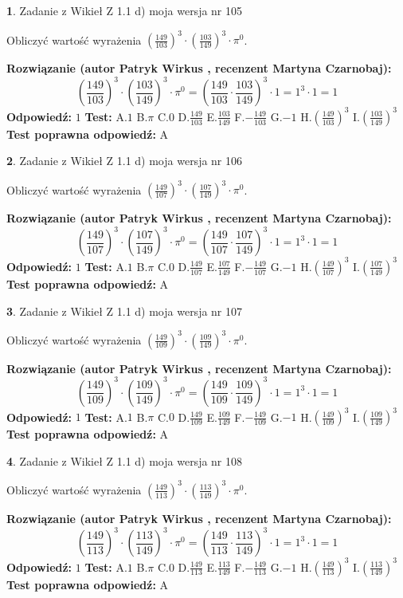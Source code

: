 \documentclass[12pt, a4paper]{article}
\theoremstyle{definition} %
\newtheorem{zad}{}
\newcommand{\zadStart}[1]{\begin{zad}#1\newline}
\newcommand{\zadStop}{\end{zad}}
\newcommand{\rozwStart}[2]{\noindent \textbf{Rozwiązanie (autor #1 , recenzent #2): }\newline}
\newcommand{\rozwStop}{\newline}
\newcommand{\odpStart}{\noindent \textbf{Odpowiedź:}\newline}
\newcommand{\odpStop}{\newline}
\newcommand{\testStart}{\noindent \textbf{Test:}\newline}
\newcommand{\testStop}{\newline}
\newcommand{\kluczStart}{\noindent \textbf{Test poprawna odpowiedź:}\newline}
\newcommand{\kluczStop}{\newline}
\begin{document}
\zadStart{Zadanie z Wikieł Z 1.1 d) moja wersja nr 105}

Obliczyć wartość wyrażenia $(\frac{149}{103})^{3} \cdot (\frac{103}{149})^{3} \cdot \pi^{0}$.
\zadStop
\rozwStart{Patryk Wirkus}{Martyna Czarnobaj}
$$(\frac{149}{103})^{3} \cdot (\frac{103}{149})^{3} \cdot \pi^{0} = (\frac{149}{103} \cdot \frac{103}{149})^{3} \cdot 1 = 1^{3} \cdot 1 = 1$$
\rozwStop
\odpStart
$1$
\odpStop
\testStart
A.$1$ B.$\pi$ C.$0$ D.$\frac{149}{103}$ E.$\frac{103}{149}$
F.$-\frac{149}{103}$ G.$-1$
H.$(\frac{149}{103})^{3}$
I.$(\frac{103}{149})^{3}$
\testStop
\kluczStart
A
\kluczStop



\zadStart{Zadanie z Wikieł Z 1.1 d) moja wersja nr 106}

Obliczyć wartość wyrażenia $(\frac{149}{107})^{3} \cdot (\frac{107}{149})^{3} \cdot \pi^{0}$.
\zadStop
\rozwStart{Patryk Wirkus}{Martyna Czarnobaj}
$$(\frac{149}{107})^{3} \cdot (\frac{107}{149})^{3} \cdot \pi^{0} = (\frac{149}{107} \cdot \frac{107}{149})^{3} \cdot 1 = 1^{3} \cdot 1 = 1$$
\rozwStop
\odpStart
$1$
\odpStop
\testStart
A.$1$ B.$\pi$ C.$0$ D.$\frac{149}{107}$ E.$\frac{107}{149}$
F.$-\frac{149}{107}$ G.$-1$
H.$(\frac{149}{107})^{3}$
I.$(\frac{107}{149})^{3}$
\testStop
\kluczStart
A
\kluczStop



\zadStart{Zadanie z Wikieł Z 1.1 d) moja wersja nr 107}

Obliczyć wartość wyrażenia $(\frac{149}{109})^{3} \cdot (\frac{109}{149})^{3} \cdot \pi^{0}$.
\zadStop
\rozwStart{Patryk Wirkus}{Martyna Czarnobaj}
$$(\frac{149}{109})^{3} \cdot (\frac{109}{149})^{3} \cdot \pi^{0} = (\frac{149}{109} \cdot \frac{109}{149})^{3} \cdot 1 = 1^{3} \cdot 1 = 1$$
\rozwStop
\odpStart
$1$
\odpStop
\testStart
A.$1$ B.$\pi$ C.$0$ D.$\frac{149}{109}$ E.$\frac{109}{149}$
F.$-\frac{149}{109}$ G.$-1$
H.$(\frac{149}{109})^{3}$
I.$(\frac{109}{149})^{3}$
\testStop
\kluczStart
A
\kluczStop



\zadStart{Zadanie z Wikieł Z 1.1 d) moja wersja nr 108}

Obliczyć wartość wyrażenia $(\frac{149}{113})^{3} \cdot (\frac{113}{149})^{3} \cdot \pi^{0}$.
\zadStop
\rozwStart{Patryk Wirkus}{Martyna Czarnobaj}
$$(\frac{149}{113})^{3} \cdot (\frac{113}{149})^{3} \cdot \pi^{0} = (\frac{149}{113} \cdot \frac{113}{149})^{3} \cdot 1 = 1^{3} \cdot 1 = 1$$
\rozwStop
\odpStart
$1$
\odpStop
\testStart
A.$1$ B.$\pi$ C.$0$ D.$\frac{149}{113}$ E.$\frac{113}{149}$
F.$-\frac{149}{113}$ G.$-1$
H.$(\frac{149}{113})^{3}$
I.$(\frac{113}{149})^{3}$
\testStop
\kluczStart
A
\kluczStop
\end{document}
